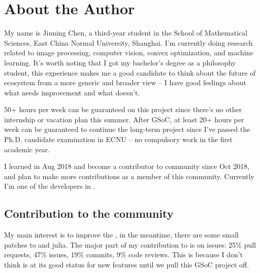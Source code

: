 
\section{About the Author}\label{sec:about_author}

My name is \textsf{Jiuning Chen}, a third-year student in the School of Mathematical Sciences, East China Normal University, Shanghai. I'm currently doing research related to image processing, computer vision, convex optimization, and machine learning. It's worth noting that I got my bachelor's degree as a philosophy student, this experience makes me a good candidate to think about the future of \images{} ecosystem from a more generic and broader view -- I have good feelings about what needs improvement and what doesn't.\par

50+ hours per week can be guaranteed on this project since there's no other internship or vacation plan this summer. After GSoC, at least 20+ hours per week can be guaranteed to continue the long-term \images{}  project since I've passed the Ph.D. candidate examination in ECNU -- no compulsory work in the first academic year. \par

I learned \langjulia in Aug 2018 and become a contributor to \langjulia community since Oct 2018, and plan to make more contributions as a member of this community. Currently I'm one of the developers in \repoimagesgithubio{}.

\subsection*{Contribution to the community}
My main interest is to improve the \images, in the meantime, there are some small patches to \flux{} and \textsf{julia}. The major part of my contribution to \textsf{\juliaimages} is on issues: 25\% pull requests, 47\% issues, 19\% commits, 9\% code reviews. This is because I don't think \images{} is at its good status for new features until we pull this GSoC project off.

